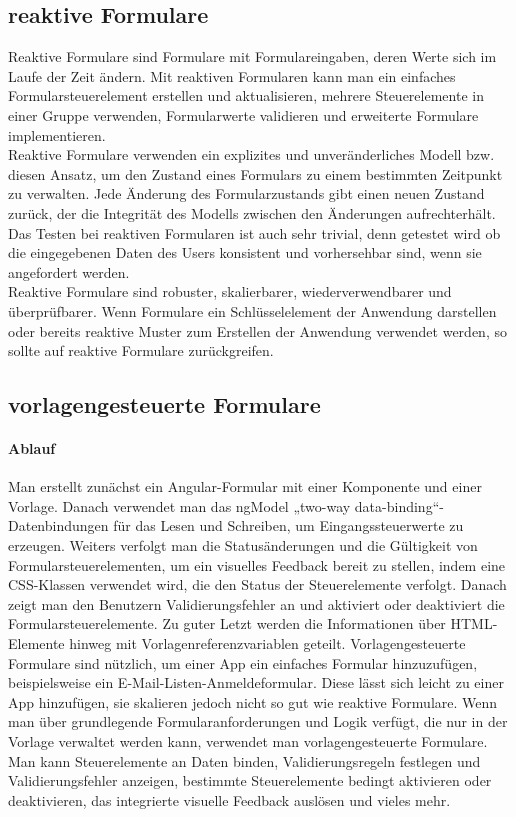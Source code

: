 \subsection{reaktive Formulare}
Reaktive Formulare\cite{ReactiveForms} sind Formulare mit Formulareingaben, deren Werte sich im Laufe der Zeit ändern. Mit reaktiven Formularen kann man ein einfaches Formularsteuerelement erstellen und aktualisieren, mehrere Steuerelemente in einer Gruppe verwenden, Formularwerte validieren und erweiterte Formulare implementieren.\\
Reaktive Formulare verwenden ein explizites und unveränderliches Modell bzw. diesen Ansatz, um den Zustand eines Formulars zu einem bestimmten Zeitpunkt zu verwalten. Jede Änderung des Formularzustands gibt einen neuen Zustand zurück, der die Integrität des Modells zwischen den Änderungen aufrechterhält.
Das Testen bei reaktiven Formularen ist auch sehr trivial, denn getestet wird ob die eingegebenen Daten des Users konsistent und vorhersehbar sind, wenn sie angefordert werden.\\
Reaktive Formulare sind robuster, skalierbarer, wiederverwendbarer und überprüfbarer. Wenn Formulare ein Schlüsselelement der Anwendung darstellen oder bereits reaktive Muster zum Erstellen der Anwendung verwendet werden, so sollte auf reaktive Formulare zurückgreifen.
\subsection{vorlagengesteuerte Formulare}
\paragraph{Ablauf}
Man erstellt zunächst ein Angular-Formular mit einer Komponente und einer Vorlage. Danach verwendet man das ngModel „two-way data-binding“- Datenbindungen für das Lesen und Schreiben, um Eingangssteuerwerte zu erzeugen. Weiters verfolgt man die Statusänderungen und die Gültigkeit von Formularsteuerelementen, um ein visuelles Feedback bereit zu stellen, indem eine CSS-Klassen verwendet wird, die den Status der Steuerelemente verfolgt. Danach zeigt man den Benutzern Validierungsfehler an und aktiviert oder deaktiviert die Formularsteuerelemente. Zu guter Letzt werden die Informationen über HTML-Elemente hinweg mit Vorlagenreferenzvariablen geteilt.
Vorlagengesteuerte Formulare\cite{TemplateDrivenForms} sind nützlich, um einer App ein einfaches Formular hinzuzufügen, beispielsweise ein E-Mail-Listen-Anmeldeformular. Diese lässt sich leicht zu einer App hinzufügen, sie skalieren jedoch nicht so gut wie reaktive Formulare. Wenn man über grundlegende Formularanforderungen und Logik verfügt, die nur in der Vorlage verwaltet werden kann, verwendet man vorlagengesteuerte Formulare.
Man kann Steuerelemente an Daten binden, Validierungsregeln festlegen und Validierungsfehler anzeigen, bestimmte Steuerelemente bedingt aktivieren oder deaktivieren, das integrierte visuelle Feedback auslösen und vieles mehr.

